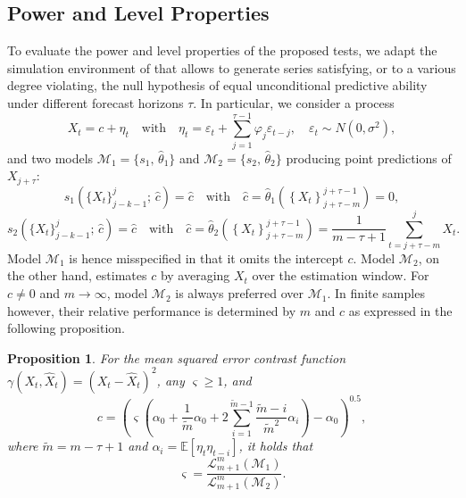 \documentclass[11pt,dvipsnames]{article}
\newtheorem{proposition}{Proposition}
\begin{document}
\subsection{Power and Level Properties}\label{TestingFiniteSamplePredictiveAbilityPL} 

To evaluate the power and level properties of the proposed tests, we adapt the simulation environment of \citet{mccrackenTestsConditionalPredictive2019} that allows to generate series satisfying, or to a various degree violating, the null hypothesis of equal unconditional predictive ability under different forecast horizons $ \tau $. In particular, we consider a process 
\begin{equation}\label{eq:AGWsim} 
X_{t}=c+\eta_{t} \quad \text{with} \quad \eta_{t}=  \varepsilon_{t} + \sum_{j=1}^{\tau-1} \varphi_{j}\varepsilon_{t-j},\quad \varepsilon_{t} \sim N(0,\sigma^{2}),
\end{equation}
and two models $ \mathcal{M}_{1}= \lbrace s_{1},\, \widehat{\theta}_{1} \rbrace $ and $ \mathcal{M}_{2}= \lbrace s_{2},\, \widehat{\theta}_{2} \rbrace$ producing point predictions of $ X_{j+\tau} $:
\begin{equation}
s_{1}\left( \lbrace X_{t} \rbrace_{j-k-1}^{j} ;\, \widehat{c} \right)=\widehat{c} \quad \text{with} \quad  \widehat{c}  = \widehat{\theta}_{1}\left( \left\lbrace X_{t} \right\rbrace_{j+\tau-m}^{j+\tau-1}\right) = 0,
\end{equation}
\begin{equation}
s_{2}\left( \lbrace X_{t} \rbrace_{j-k-1}^{j} ;\, \widehat{c} \right)=\widehat{c} \quad \text{with} \quad  \widehat{c}  = \widehat{\theta}_{2}\left( \left\lbrace X_{t} \right\rbrace_{j+\tau-m}^{j+\tau-1}\right) = \dfrac{1}{m-\tau+1}\sum_{t=j+\tau-m}^{j} X_{t}.
\end{equation}
Model $ \mathcal{M}_{1} $ is hence misspecified in that it omits the intercept $ c $. Model $ \mathcal{M}_{2} $, on the other hand, estimates $ c $ by averaging $ X_{t} $ over the estimation window. For $ c\neq 0 $ and $ m \rightarrow \infty $, model $ \mathcal{M}_{2} $ is always preferred over $ \mathcal{M}_{1} $. In finite samples however, their relative performance is determined by $ m $ and $ c $ as expressed in the following proposition.

\begin{proposition} \label{prop:PropositionAGWsim}
For the mean squared error contrast function $ \gamma(X_{t},\widehat{X}_{t})=(X_{t} - \widehat{X}_{t})^{2} $, any $ \varsigma \geq 1 $, and
\begin{equation}
c=\left(\varsigma\left( \alpha_{0} + \dfrac{1}{ \widetilde{m}}\alpha_{0} + 2 \sum_{i=1}^{\widetilde{m}-1}\dfrac{\widetilde{m}-i}{\widetilde{m}^2} \alpha_{i}\right) - \alpha_{0}\right)^{0.5}, 
\end{equation}
where $ \widetilde{m}=m-\tau+1 $ and $ \alpha_{i}=\mathbb{E}\left[\eta_{t}\eta_{t-i} \right] $, it holds that
\begin{equation}
\varsigma=\dfrac{\mathcal{L}_{m+1}^{m}(\mathcal{M}_{1})}{\mathcal{L}_{m+1}^{m}(\mathcal{M}_{2})}.
\end{equation}
\end{proposition}
\end{document}
